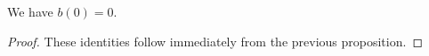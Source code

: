 \begin{proposition}\label{prop:b0}\leanok
We have $b(0) = 0$.
\end{proposition}
\begin{proof}
    These identities follow immediately from the previous proposition. %
\end{proof}
